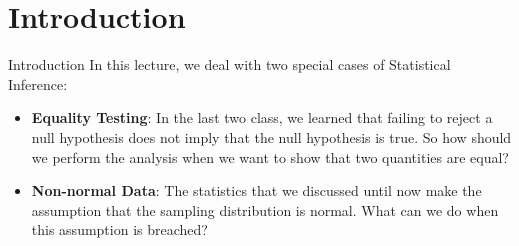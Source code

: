 \section{Introduction}

\begin{frame}{Introduction}
  In this lecture, we deal with two special cases of Statistical Inference:\bigskip
  \begin{itemize}
    \item {\bf Equality Testing}: In the last two class, we learned that failing to reject a null hypothesis does not imply that the null hypothesis is true. So how should we perform the analysis when we want to show that two quantities are equal?\bigskip

    \item {\bf Non-normal Data}: The statistics that we discussed until now make the assumption that the sampling distribution is normal. What can we do when this assumption is breached?
  \end{itemize}\bigskip
\end{frame}
